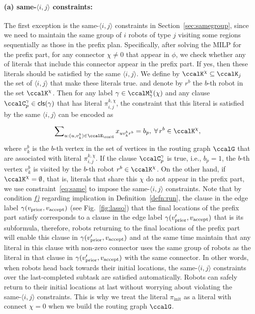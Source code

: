 \documentclass[Afour,sageh,times]{sagej}
\newcommand{\clause}[1]{\mathsf{cls}(#1)}
\newcommand{\vertex}[1]{v_{\textup{#1}}}
\newcommand{\ag}[2]{\langle#1,#2\rangle}
\renewcommand{\ap}[3]{\mathcal{\pi}_{{#1},{#2}}^{#3}}
\newcommand{\aap}[4]{\mathcal{\pi}_{{#1},{#2}}^{#3,#4}}
\begin{document}
{{{\paragraph{\quad (a) same-$\ag{i}{j}$ constraints:} The first exception is the same-$\ag{i}{j}$ constraints in Section~\ref{sec:samegroup}, since we need to maintain the same group of $i$ robots of type $j$ visiting some regions sequentially as those in the prefix plan. Specifically, after solving the MILP for the prefix part, for any connector $\chi\not=0$ that appear in $\phi$, we check whether any of literals that include this connector appear in the prefix part. If yes, then these literals should be satisfied by the same $\ag{i}{j}$. We define by $\ccalK^\chi \subseteq \ccalK_j$ the set of $\ag{i}{j}$ that make these literals true. and denote by  $r^b$ the $b$-th robot in the set $\ccalK^\chi$. Then for any label $\gamma \in\ccalM_\mathsf{\gamma}^\chi(\chi)$ and any clause $\ccalC_p^\gamma \in \clause{\gamma}$ that has  literal $\aap{i}{j}{k}{\chi}$, the constraint that this literal is satisfied by the same $\ag{i}{j}$  can be encoded as}
\begingroup\makeatletter{}\check@mathfonts
\def\maketag@@@#1{\hbox{\m@th\normalsize\normalfont#1}}%
\begin{align}\label{eq:same_suffix}
    \sum\nolimits_{u:(u, v_k^b) \in \ccalE_\ccalG} x_{u v_k^b r^b} =  b_p, \;\forall\, r^b \in \ccalK^\chi,
  \end{align}
\endgroup
where $v_k^b$ is the $b$-th vertex in the set of vertices in the routing graph $\ccalG$  that are associated with literal $\ap{i}{j}{k,\chi}$. If the clause $\ccalC_p^\gamma$ is true, i.e.,  $b_p=1$, the $b$-th vertex $v_k^b$ is visited by the $b$-th robot $r^b \in \ccalK^\chi$. On the other hand, if $\ccalK^\chi = \emptyset$, that is, literals that share this $\chi$ do not appear in the prefix part, we use constraint~\eqref{eq:same} to impose the same-$\ag{i}{j}$ constraints. Note that by condition \hyperref[cond:f]{\it f)} regarding implication in Definition~\ref{defn:run}, the clause in the edge label $\gamma(\vertex{prior}, \vertex{accept})$ (see Fig.~\ref{fig:lasso}) that the final locations of the prefix part satisfy corresponds to a clause in the edge label $\gamma(\vertex{prior}', \vertex{accept})$ that is its subformula, therefore, robots returning to the final locations of the prefix part will enable this clause in $\gamma(\vertex{prior}', \vertex{accept})$ and at the same time maintain that any literal in this clause with non-zero connector uses the same group of robots as the literal in that clause in $\gamma(\vertex{prior}', \vertex{accept})$ with the same connector.  In other words, when robots head back towards their initial locations, the same-$\ag{i}{j}$ constraints over the last-completed subtask are satisfied automatically. Robots can safely return to their initial locations at last without worrying about violating the same-$\ag{i}{j}$ constraints. This is why we treat the literal $\pi_{\text{init}}$ as a literal with connect $\chi=0$ when we build the routing graph $\ccalG$.

}}
\end{document}
